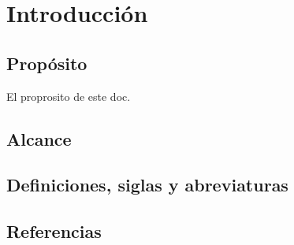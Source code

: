 \chapter{Introducción}

\section{Propósito}
 El proprosito de este doc.     
\section{Alcance}

\section{Definiciones, siglas y abreviaturas}

\section{Referencias}
